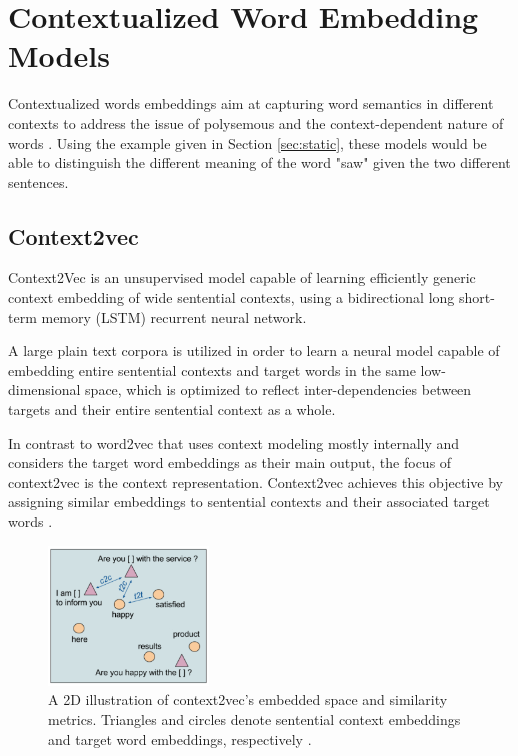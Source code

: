         

    
    \section{Contextualized Word Embedding Models}
    \label{sec:context}    
        \par Contextualized words embeddings aim at capturing word semantics in different contexts to address the issue of polysemous and the context-dependent nature of words \cite{Batista2018}. Using the example given in  Section \ref{sec:static}, these models would be able to distinguish the different meaning of the word "saw" given the two different sentences.

        \subsection{Context2vec}
        
            \par Context2Vec is an unsupervised model capable of learning efficiently generic context embedding of wide sentential contexts, using a bidirectional 
            long short-term memory (LSTM) recurrent neural network. 

            A large plain text corpora is utilized in order to learn a neural model capable of embedding  entire  sentential  contexts  and  target words in the same low-dimensional space, which is optimized to reflect inter-dependencies between targets and their entire sentential context as a whole. 
            
            
            In contrast to word2vec that uses context modeling mostly internally and considers the target word embeddings as their main output, the focus of context2vec is the context representation. Context2vec achieves this objective by assigning similar embeddings to sentential contexts and their associated target words \cite{Melamud2016}.

            \begin{figure}[H]
                \centering
                \captionsetup{justification=centering}
                \includegraphics[width=0.38\textwidth]{Sections/3StateOfTheArt/3_images/context2vec_embedding.png}
                \caption[Context2vec’s embedded space and similarity metrics.]{A 2D illustration of context2vec’s embedded space and similarity metrics. Triangles and circles denote sentential context embeddings and target word embeddings, respectively \cite{Melamud2016}.} 
            \end{figure}


